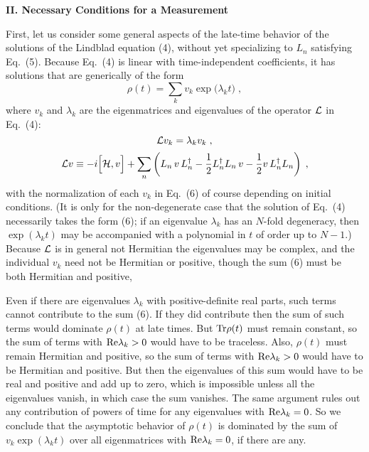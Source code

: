 \documentclass[12pt]{article}
\begin{document}

\begin{center}
{\bf II. Necessary Conditions for a Measurement}
\end{center}

First, let us consider some general aspects of the late-time behavior of the solutions of the Lindblad equation (4), without yet specializing to $L_n$ satisfying Eq.~(5).  Because Eq.~(4) is linear with time-independent coefficients, it has solutions that are generically of the form
\begin{equation}
\rho(t)=\sum_k v_k \exp\Big(\lambda_k t\Big)\;,
\end{equation}
where $v_k$ and $\lambda_k$ are the eigenmatrices and eigenvalues of the operator ${\cal L}$ in Eq.~(4):
\begin{equation}
{\cal L}v_k=\lambda_k v_k\;,
\end{equation}
\begin{equation}
{\cal L}v\equiv -i\Big[{\cal H},v\Big]+\sum_n \left(L_n\,v\,L_n^\dagger-\frac{1}{2}L_n^\dagger L_n\, v
-\frac{1}{2}v\, L_n^\dagger L_n\right)\;,
\end{equation}
with the normalization of each $v_k$ in Eq.~(6) of course depending on initial conditions.
(It is only  for the non-degenerate case that the solution of Eq.~(4) necessarily takes the form (6); if an eigenvalue $\lambda_k$ has an $N$-fold degeneracy, then $\exp(\lambda_kt)$ may be accompanied with a polynomial in $t$ of order up to $N-1$.)  Because ${\cal L}$ is in general not Hermitian the eigenvalues may be complex, and  the individual $v_k$ need not be Hermitian or positive, though the sum (6) must be both Hermitian and positive, 

Even if there are  eigenvalues $\lambda_k$ with positive-definite real parts, such terms cannot contribute to the sum (6).  If they did contribute then the sum of such terms would dominate $\rho(t)$  at late times. But ${\rm Tr}\rho(t)$ must remain constant, so the sum of terms with ${\rm Re}\lambda_k>0$ would have to be traceless.  Also, $\rho(t)$ must remain Hermitian and positive, so the sum of terms with ${\rm Re}\lambda_k>0$ would have to be Hermitian and positive. But then the eigenvalues of this sum would have to be real and positive and add up to zero, which is impossible unless all the eigenvalues vanish, in which case the sum vanishes.  The  same argument rules out any contribution of powers of time for any eigenvalues with ${\rm Re}\lambda_k=0$.  So we conclude that the asymptotic behavior of $\rho(t)$ is dominated by the sum of $v_k\exp(\lambda_k t)$ over all eigenmatrices with ${\rm Re}\lambda_k=0$, if there are any.  
\end{document}
